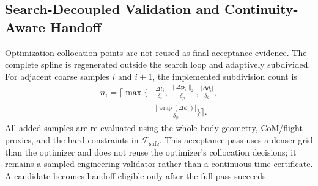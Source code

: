 \documentclass[journal,twoside]{IEEEtran}
\newcommand{\wrap}{\operatorname{wrap}}
\begin{document}
\subsection{Search-Decoupled Validation and Continuity-Aware Handoff}
Optimization collocation points are not reused as final acceptance evidence. The complete spline is regenerated outside the search loop and adaptively subdivided. For adjacent coarse samples $i$ and $i+1$, the implemented subdivision count is
\begin{equation}
\begin{aligned}
n_i=\Bigg\lceil\max\Bigg\{&
 \frac{\Delta t_i}{\delta_t},
 \frac{\|\Delta\mathbf p_i\|_2}{\delta_p},
 \frac{|\Delta\theta_i|}{\delta_\theta},\\[-1mm]
&
 \frac{|\wrap(\Delta\phi_i)|}{\delta_\phi}
\Bigg\}\Bigg\rceil.
\end{aligned}
\label{eq:dense_validation}
\end{equation}
All added samples are re-evaluated using the whole-body geometry, CoM/flight proxies, and the hard constraints in $\mathcal F_{\mathrm{safe}}$. This acceptance pass uses a denser grid than the optimizer and does not reuse the optimizer's collocation decisions; it remains a sampled engineering validator rather than a continuous-time certificate. A candidate becomes handoff-eligible only after the full pass succeeds.
\end{document}
